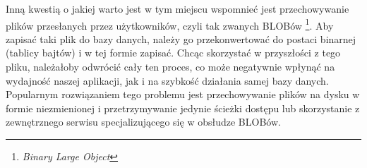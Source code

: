 \par Inną kwestią o jakiej warto jest w tym miejscu wspomnieć jest przechowywanie plików przesłanych przez użytkowników, czyli tak zwanych BLOBów \footnote{\emph{Binary Large Object}}. Aby zapisać taki plik do bazy danych, należy go przekonwertować do postaci binarnej (tablicy bajtów) i w tej formie zapisać. Chcąc skorzystać w przyszłości z tego pliku, należałoby odwrócić cały ten proces, co może negatywnie wpłynąć na wydajność naszej aplikacji, jak i na szybkość działania samej bazy danych. Popularnym rozwiązaniem tego problemu jest przechowywanie plików na dysku w formie niezmienionej i przetrzymywanie jedynie ścieżki dostępu lub skorzystanie z zewnętrznego serwisu specjalizującego się w obsłudze BLOBów.